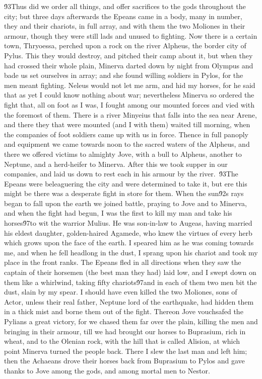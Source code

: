 {\'93Thus did we order all things, and offer sacrifices to the gods throughout the city; but three days afterwards the Epeans came in a body, many in number, they and their chariots, in full array, and with them the two Moliones in their armour, though they were still lads and unused to fighting. Now there is a certain town, Thryoessa, perched upon a rock on the river Alpheus, the border city of Pylus. This they would destroy, and pitched their camp about it, but when they had crossed their whole plain, Minerva darted down by night from Olympus and bade us set ourselves in array; and she found willing soldiers in Pylos, for the men meant fighting. Neleus would not let me arm, and hid my horses, for he said that as yet I could know nothing about war; nevertheless Minerva so ordered the fight that, all on foot as I was, I fought among our mounted forces and vied with the foremost of them. There is a river Minyeius that falls into the sea near Arene, and there they that were mounted (and I with them) waited till morning, when the companies of foot soldiers came up with us in force. Thence in full panoply and equipment we came towards noon to the sacred waters of the Alpheus, and there we offered victims to almighty Jove, with a bull to Alpheus, another to Neptune, and a herd-heifer to Minerva. After this we took supper in our companies, and laid us down to rest each in his armour by the river.\
\'93The Epeans were beleaguering the city and were determined to take it, but ere this might be there was a desperate fight in store for them. When the sun\'92s rays began to fall upon the earth we joined battle, praying to Jove and to Minerva, and when the fight had begun, I was the first to kill my man and take his horses\'97to wit the warrior Mulius. He was son-in-law to Augeas, having married his eldest daughter, golden-haired Agamede, who knew the virtues of every herb which grows upon the face of the earth. I speared him as he was coming towards me, and when he fell headlong in the dust, I sprang upon his chariot and took my place in the front ranks. The Epeans fled in all directions when they saw the captain of their horsemen (the best man they had) laid low, and I swept down on them like a whirlwind, taking fifty chariots\'97and in each of them two men bit the dust, slain by my spear. I should have even killed the two Moliones, sons of Actor, unless their real father, Neptune lord of the earthquake, had hidden them in a thick mist and borne them out of the fight. Thereon Jove vouchsafed the Pylians a great victory, for we chased them far over the plain, killing the men and bringing in their armour, till we had brought our horses to Buprasium, rich in wheat, and to the Olenian rock, with the hill that is called Alision, at which point Minerva turned the people back. There I slew the last man and left him; then the Achaeans drove their horses back from Buprasium to Pylos and gave thanks to Jove among the gods, and among mortal men to Nestor.\
}
